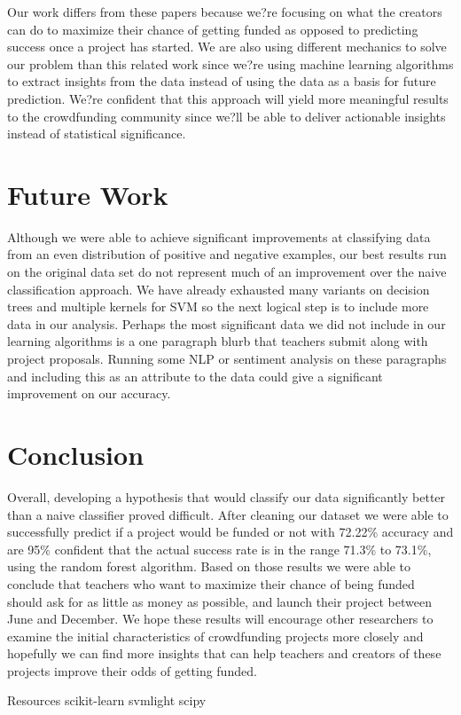 \documentclass{article}
\begin{document}
Our work differs from these papers because we?re focusing on what the creators can do to maximize their chance of getting funded as opposed to predicting success once a project has started. We are also using different mechanics to solve our problem than this related work since we?re using machine learning algorithms to extract insights from the data instead of using the data as a basis for future prediction. We?re confident that this approach will yield more meaningful results to the crowdfunding community since we?ll be able to deliver actionable insights instead of statistical significance.

\section{Future Work}
Although we were able to achieve significant improvements at classifying data from an even distribution of positive and negative examples, our best results run on the original data set do not represent much of an improvement over the naive classification approach. We have already exhausted many variants on decision trees and multiple kernels for SVM so the next logical step is to include more data in our analysis. Perhaps the most significant data we did not include in our learning algorithms is a one paragraph blurb that teachers submit along with project proposals. Running some NLP or sentiment analysis on these paragraphs and including this as an attribute to the data could give a significant improvement on our accuracy.

\section{Conclusion} 
Overall, developing a hypothesis that would classify our data significantly better than a naive classifier proved difficult. After cleaning our dataset we were able to successfully predict if a project would be funded or not with 72.22\% accuracy and are 95\% confident that the actual success rate is in the range 71.3\% to 73.1\%, using the random forest algorithm. Based on those results we were able to conclude that teachers who want to maximize their chance of being funded should ask for as little as money as possible, and launch their project between June and December. We hope these results will encourage other researchers to examine the initial characteristics of crowdfunding projects more closely and hopefully we can find more insights that can help teachers and creators of these projects improve their odds of getting funded. 

Resources
scikit-learn
svmlight
scipy
\end{document}
